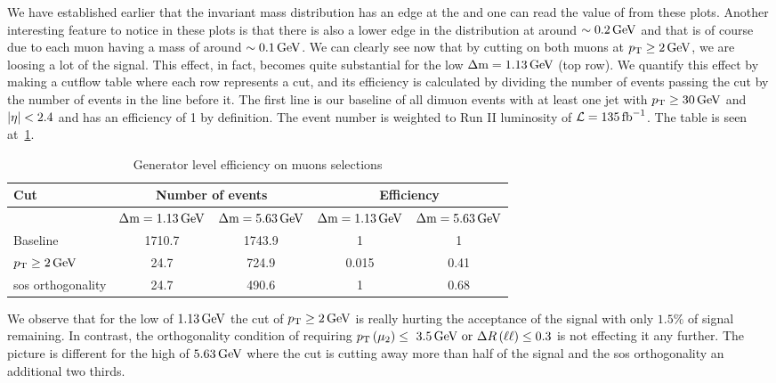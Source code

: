 We have established earlier that the invariant mass distribution has an edge at the \dm and one can read the value of \dm from these plots. Another interesting feature to notice in these plots is that there is also a lower edge in the \dm distribution at around $\sim 0.2\,\text{Ge\hspace{-.08em}V}$ and that is of course due to each muon having a mass of around $\sim 0.1\,\text{Ge\hspace{-.08em}V}$. We can clearly see now that by cutting on both muons at $p_{\mathrm{T}}\geq 2\,\text{Ge\hspace{-.08em}V}$, we are loosing a lot of the signal. This effect, in fact, becomes quite substantial for the low $\Delta\mathrm{m}=1.13\,\text{Ge\hspace{-.08em}V}$ (top row). We quantify this effect by making a cutflow table where each row represents a cut, and its efficiency is calculated by dividing the number of events passing the cut by the number of events in the line before it. The first line is our baseline of all dimuon events with at least one jet with $p_{\mathrm{T}} \geq 30\,\text{Ge\hspace{-.08em}V}$ and $\lvert \eta \rvert<2.4$ and has an efficiency of 1 by definition. The event number is weighted to Run II luminosity of $\mathcal{L} = 135 \mbox{\ensuremath{\,\text{fb}^{-1}}}$. The table is seen at~\ref{tab:gen-muon-pt-dr-efficiency}.

\begin{table}[!htb]
	\centering
	\label{tab:gen-muon-pt-dr-efficiency}
		\caption{Generator level efficiency on muons selections}
			\begin{tabular}{l|cc|cc} \hline
			Cut & \multicolumn{2}{c|}{Number of events} & \multicolumn{2}{c}{Efficiency} \\ \hline
			
			 & $\Delta\mathrm{m}=1.13\,\text{Ge\hspace{-.08em}V}$ & $\Delta\mathrm{m}=5.63\,\text{Ge\hspace{-.08em}V}$ & $\Delta\mathrm{m}=1.13\,\text{Ge\hspace{-.08em}V}$ & $\Delta\mathrm{m}=5.63\,\text{Ge\hspace{-.08em}V}$ \\
			Baseline & 1710.7 & 1743.9 & 1 & 1\\
			$p_{\mathrm{T}}\geq 2\,\text{Ge\hspace{-.08em}V}$ & 24.7 & 724.9 & 0.015 & 0.41\\
			\gls{sos} orthogonality & 24.7 & 490.6 & 1 & 0.68 \\ \hline
			\end{tabular}
\end{table}

We observe that for the low \dm of $1.13\,\text{Ge\hspace{-.08em}V}$ the cut of $p_{\mathrm{T}}\geq 2\,\text{Ge\hspace{-.08em}V}$ is really hurting the acceptance of the signal with only $1.5\%$ of signal remaining. In contrast, the orthogonality condition of requiring $p_{\mathrm{T}}\left(\mu_2\right)\leq~3.5\,\text{Ge\hspace{-.08em}V}\text{ or }\Delta R\left(\ell\ell\right)\leq 0.3$ is not effecting it any further. The picture is different for the high \dm of $5.63\,\text{Ge\hspace{-.08em}V}$ where the \pt cut is cutting away more than half of the signal and the \gls{sos} orthogonality an additional two thirds.

